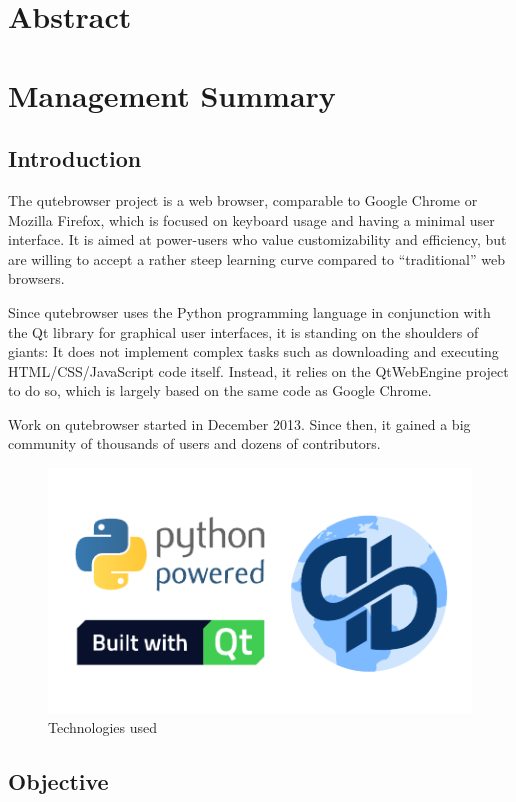 
\chapter*{Abstract}
\fixme{}

\chapter*{Management Summary}
\section*{Introduction}
The qutebrowser project is a web browser, comparable to Google Chrome or Mozilla
Firefox, which is focused on keyboard usage and having a minimal user
interface. It is aimed at power-users who value customizability and efficiency,
but are willing to accept a rather steep learning curve compared to
``traditional'' web browsers.

Since qutebrowser uses the Python programming language in conjunction with the
Qt library for graphical user interfaces, it is standing on the shoulders of
giants: It does not implement complex tasks such as downloading and executing
HTML/CSS/JavaScript code itself. Instead, it relies on the QtWebEngine project
to do so, which is largely based on the same code as Google Chrome.

Work on qutebrowser started in December 2013. Since then, it gained a big
community of thousands of users and dozens of contributors.

\begin{figure}[H]
  \centering
  \includegraphics[width=0.7\linewidth]{img/logos.pdf}
  \caption{Technologies used}
\end{figure}

\section*{Objective}

